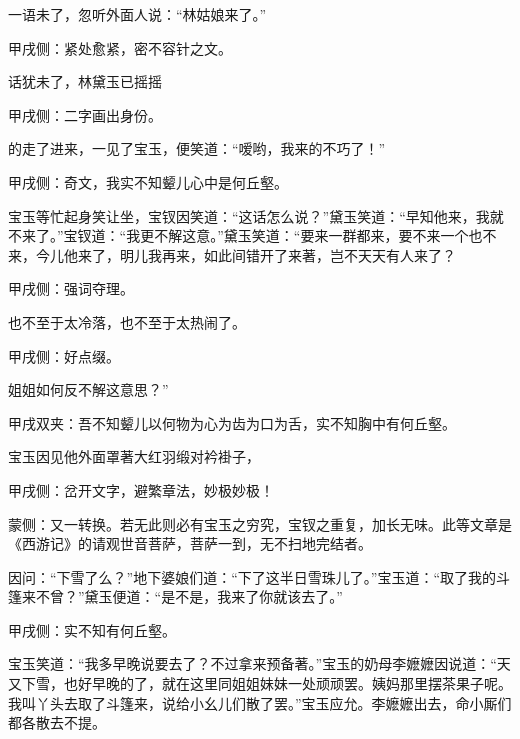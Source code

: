 \begin{parag}
    一语未了，忽听外面人说：“林姑娘来了。”\begin{note}甲戌侧：紧处愈紧，密不容针之文。\end{note}话犹未了，林黛玉已摇摇\begin{note}甲戌侧：二字画出身份。\end{note}的走了进来，一见了宝玉，便笑道：“嗳哟，我来的不巧了！”\begin{note}甲戌侧：奇文，我实不知颦儿心中是何丘壑。\end{note}宝玉等忙起身笑让坐，宝钗因笑道：“这话怎么说？”黛玉笑道：“早知他来，我就不来了。”宝钗道：“我更不解这意。”黛玉笑道：“要来一群都来，要不来一个也不来，今儿他来了，明儿我再来，如此间错开了来著，岂不天天有人来了？\begin{note}甲戌侧：强词夺理。\end{note}也不至于太冷落，也不至于太热闹了。\begin{note}甲戌侧：好点缀。\end{note}姐姐如何反不解这意思？”\begin{note}甲戌双夹：吾不知颦儿以何物为心为齿为口为舌，实不知胸中有何丘壑。\end{note}
\end{parag}


\begin{parag}
    宝玉因见他外面罩著大红羽缎对衿褂子，\begin{note}甲戌侧：岔开文字，避繁章法，妙极妙极！\end{note}\begin{note}蒙侧：又一转换。若无此则必有宝玉之穷究，宝钗之重复，加长无味。此等文章是《西游记》的请观世音菩萨，菩萨一到，无不扫地完结者。\end{note}因问：“下雪了么？”地下婆娘们道：“下了这半日雪珠儿了。”宝玉道：“取了我的斗篷来不曾？”黛玉便道：“是不是，我来了你就该去了。”\begin{note}甲戌侧：实不知有何丘壑。\end{note}宝玉笑道：“我多早晚说要去了？不过拿来预备著。”宝玉的奶母李嬷嬷因说道：“天又下雪，也好早晚的了，就在这里同姐姐妹妹一处顽顽罢。姨妈那里摆茶果子呢。我叫丫头去取了斗篷来，说给小幺儿们散了罢。”宝玉应允。李嬷嬷出去，命小厮们都各散去不提。
\end{parag}


